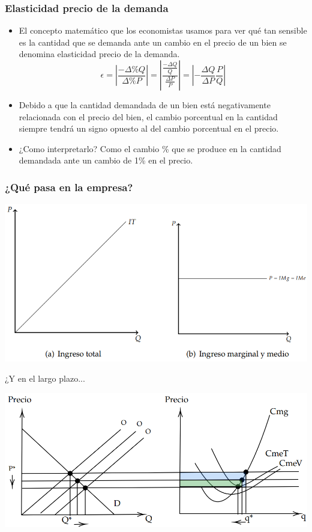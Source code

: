 \documentclass{beamer}
\begin{document}
\begin{frame}
    \frametitle{Elasticidad precio de la demanda}
    \begin{itemize}
        \item El concepto matemático que los economistas usamos para ver qué tan sensible es la cantidad que se demanda ante un cambio en el precio de un bien se denomina elasticidad precio de la demanda.
        \begin{equation*}
            \epsilon = \left|\frac{- \Delta \% Q}{\Delta \% P}\right| = \left|\frac{\frac{- \Delta Q}{Q}}{\frac{\Delta P}{P}}\right| = \left|-\frac{\Delta Q}{\Delta P} \frac{P}{Q}\right|
        \end{equation*}
        \item Debido a que la cantidad demandada de un bien está negativamente relacionada con el precio del bien, el cambio porcentual en la cantidad siempre tendrá un signo opuesto al del cambio porcentual en el precio.
        \item ¿Como interpretarlo? Como el cambio \% que se produce en la cantidad demandada ante un cambio de 1\% en el precio.
    \end{itemize}
\end{frame}

\begin{frame}
    \frametitle{¿Qué pasa en la empresa?}
    \includegraphics[scale=0.6]{../Figures/C21.4.png}
\end{frame}

\begin{frame}{¿Y en el largo plazo...}
    \begin{center}
    \includegraphics[scale=0.55]{../Figures/C21.6.png}
    \end{center}
\end{frame}
\end{document}
